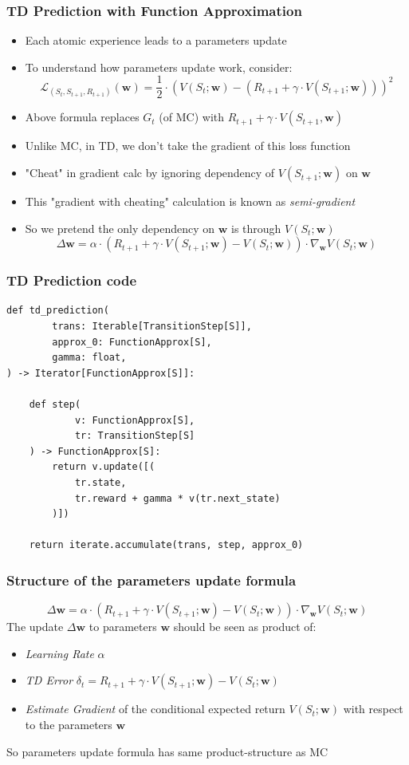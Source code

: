 \documentclass[handout]{beamer}
\begin{document}
\begin{frame}
\frametitle{TD Prediction with Function Approximation}
\pause
\begin{itemize}[<+->]
\item Each atomic experience leads to a parameters update
\item To understand how parameters update work, consider:
$$\mathcal{L}_{(S_t,S_{t+1},R_{t+1})}(\bm{w}) = \frac 1 2 \cdot (V(S_t;\bm{w}) - (R_{t+1} + \gamma \cdot V(S_{t+1}; \bm{w})))^2$$
\item Above formula replaces $G_t$ (of MC) with $R_{t+1} + \gamma \cdot V(S_{t+1}, \bm{w})$
\item Unlike MC, in TD, we don't take the gradient of this loss function
\item "Cheat" in gradient calc by ignoring dependency of $V(S_{t+1}; \bm{w})$ on $\bm{w}$
\item This "gradient with cheating" calculation is known as {\em semi-gradient}
\item So we pretend the only dependency on $\bm{w}$ is through $V(S_t; \bm{w})$
$$\Delta \bm{w} = \alpha \cdot (R_{t+1} + \gamma \cdot V(S_{t+1};\bm{w}) - V(S_t;\bm{w})) \cdot \nabla_{\bm{w}} V(S_t;\bm{w})$$
\end{itemize}
\end{frame}

\begin{frame}[fragile]
\frametitle{TD Prediction code}
\pause
\begin{lstlisting}
def td_prediction(
        trans: Iterable[TransitionStep[S]],
        approx_0: FunctionApprox[S],
        gamma: float,
) -> Iterator[FunctionApprox[S]]:

    def step(
            v: FunctionApprox[S],
            tr: TransitionStep[S]
    ) -> FunctionApprox[S]:
        return v.update([(
            tr.state,
            tr.reward + gamma * v(tr.next_state)
        )])
        
    return iterate.accumulate(trans, step, approx_0)
\end{lstlisting}    
\end{frame}

\begin{frame}
\frametitle{Structure of the parameters update formula}
\pause
$$\Delta \bm{w} = \alpha \cdot (R_{t+1} + \gamma \cdot V(S_{t+1};\bm{w}) - V(S_t;\bm{w})) \cdot \nabla_{\bm{w}} V(S_t;\bm{w})$$
\vspace{3mm}
\pause
The update $\Delta \bm{w}$ to parameters $\bm{w}$ should be seen as product of:
\pause
\begin{itemize}[<+->]
\item {\em Learning Rate} $\alpha$
\item {\em TD Error} $\delta_t = R_{t+1} + \gamma \cdot V(S_{t+1}; \bm{w}) - V(S_t; \bm{w})$
\item {\em Estimate Gradient} of the conditional expected return $V(S_t;\bm{w})$ with respect to the parameters $\bm{w}$
\end{itemize}
\pause
\vspace{3mm}
So parameters update formula has same product-structure as MC
\end{frame}
\end{document}
